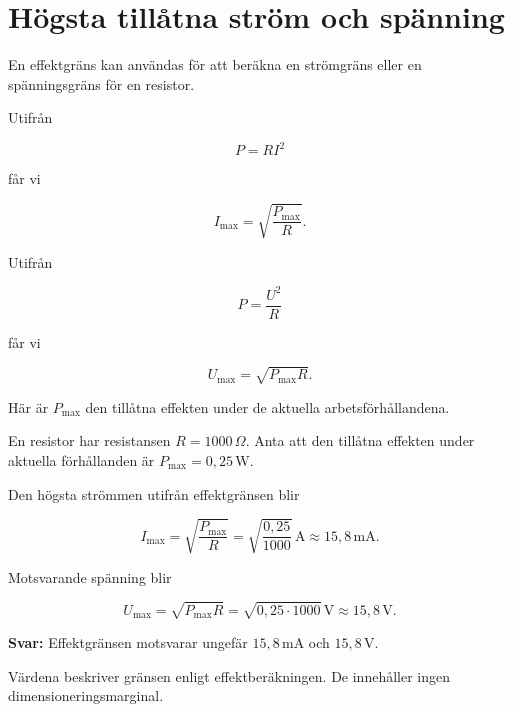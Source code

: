 \documentclass[
  swedish,
  11pt,
  a4paper,
  DIV=11,
  numbers=noendperiod,
  twoside,
  open=any]{scrreprt}
\begin{document}
\section{Högsta tillåtna ström och
spänning}\label{sec-effekt-hogsta-tillatna-strom-och-spanning}

En effektgräns kan användas för att beräkna en strömgräns eller en
spänningsgräns för en resistor.

Utifrån

\[
P = RI^2
\]

får vi

\[
\boxed{I_\mathrm{max}
= \sqrt{\frac{P_\mathrm{max}}{R}}}.
\]

Utifrån

\[
P = \frac{U^2}{R}
\]

får vi

\[
\boxed{U_\mathrm{max}
= \sqrt{P_\mathrm{max}R}}.
\]

Här är \(P_\mathrm{max}\) den tillåtna effekten under de aktuella
arbetsförhållandena.

\begin{tcolorbox}[enhanced jigsaw, arc=.35mm, bottomrule=.15mm, bottomtitle=1mm, breakable, colback=white, colbacktitle=quarto-callout-note-color!10!white, colframe=quarto-callout-note-color-frame, coltitle=black, left=2mm, leftrule=.75mm, opacityback=0, opacitybacktitle=0.6, rightrule=.15mm, title={Exempel: gränser från tillåten effekt}, titlerule=0mm, toprule=.15mm, toptitle=1mm]

En resistor har resistansen \(R = 1000\,\Omega\). Anta att den tillåtna
effekten under aktuella förhållanden är
\(P_\mathrm{max} = 0{,}25\,\mathrm{W}\).

Den högsta strömmen utifrån effektgränsen blir

\[
I_\mathrm{max}
= \sqrt{\frac{P_\mathrm{max}}{R}}
= \sqrt{\frac{0{,}25}{1000}}\,\mathrm{A}
\approx 15{,}8\,\mathrm{mA}.
\]

Motsvarande spänning blir

\[
U_\mathrm{max}
= \sqrt{P_\mathrm{max}R}
= \sqrt{0{,}25 \cdot 1000}\,\mathrm{V}
\approx 15{,}8\,\mathrm{V}.
\]

\textbf{Svar:} Effektgränsen motsvarar ungefär \(15{,}8\,\mathrm{mA}\)
och \(15{,}8\,\mathrm{V}\).

Värdena beskriver gränsen enligt effektberäkningen. De innehåller ingen
dimensioneringsmarginal.

\end{tcolorbox}
\end{document}
